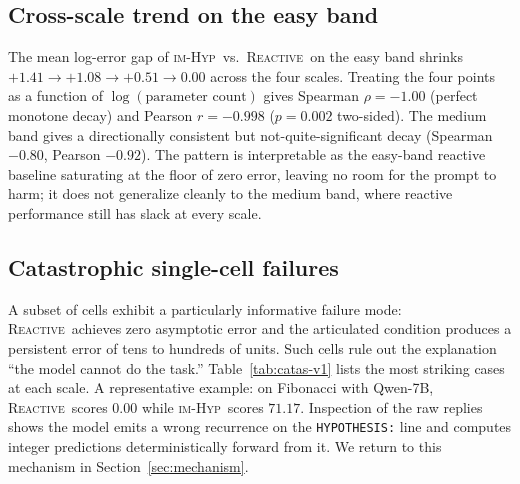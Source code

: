 \documentclass[11pt]{article}
\newcommand{\imhyp}{\textsc{im-Hyp}}
\newcommand{\reactive}{\textsc{Reactive}}
\begin{document}
\subsection{Cross-scale trend on the easy band}
The mean log-error gap of \imhyp\ vs.\ \reactive\ on the easy band
shrinks $+1.41 \to +1.08 \to +0.51 \to 0.00$ across the four
scales.  Treating the four points as a function of
$\log(\text{parameter count})$ gives Spearman $\rho = -1.00$ (perfect
monotone decay) and Pearson $r = -0.998$ ($p = 0.002$ two-sided).
The medium band gives a directionally consistent but
not-quite-significant decay (Spearman $-0.80$, Pearson $-0.92$).
The pattern is interpretable as the easy-band reactive baseline
saturating at the floor of zero error, leaving no room for the
prompt to harm; it does not generalize cleanly to the medium band,
where reactive performance still has slack at every scale.

\subsection{Catastrophic single-cell failures}
A subset of cells exhibit a particularly informative failure mode:
\reactive\ achieves zero asymptotic error and the articulated
condition produces a persistent error of tens to hundreds of units.
Such cells rule out the explanation ``the model cannot do the
task.''  Table~\ref{tab:catas-v1} lists the most striking cases at
each scale.  A representative example: on Fibonacci with Qwen-7B,
\reactive\ scores $0.00$ while \imhyp\ scores $71.17$.  Inspection
of the raw replies shows the model emits a wrong recurrence on the
\verb|HYPOTHESIS:| line and computes integer predictions
deterministically forward from it.  We return to this mechanism in
Section~\ref{sec:mechanism}.
\end{document}
